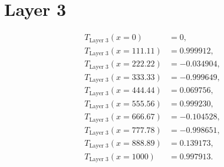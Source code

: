 \documentclass{article}
\begin{document}
\section*{Layer 3}
\begin{align*}
T_{\text{Layer 3}}(x = 0) & = 0, \\
T_{\text{Layer 3}}(x = 111.11) & = 0.999912, \\
T_{\text{Layer 3}}(x = 222.22) & = -0.034904, \\
T_{\text{Layer 3}}(x = 333.33) & = -0.999649, \\
T_{\text{Layer 3}}(x = 444.44) & = 0.069756, \\
T_{\text{Layer 3}}(x = 555.56) & = 0.999230, \\
T_{\text{Layer 3}}(x = 666.67) & = -0.104528, \\
T_{\text{Layer 3}}(x = 777.78) & = -0.998651, \\
T_{\text{Layer 3}}(x = 888.89) & = 0.139173, \\
T_{\text{Layer 3}}(x = 1000) & = 0.997913.
\end{align*}
\end{document}
